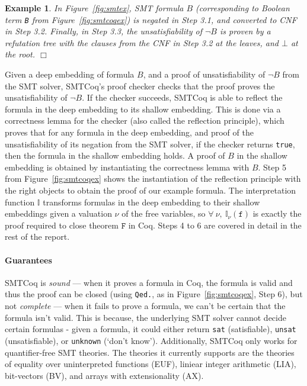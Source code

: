 \documentclass[11pt]{article}
\newtheorem{example}{Example}[section]
\begin{document}
	\begin{example} 
		\em In Figure~\ref{fig:smtex}, 
		SMT formula $B$ (corresponding
		to Boolean term \texttt{B}
		from Figure~\ref{fig:smtcoqex}) is 
		negated in Step 3.1, and converted 
		to CNF in Step 3.2.
		Finally, in Step 3.3, the 
		unsatisfiability of $\neg B$ is 
		proven by a refutation tree with 
		the clauses from the CNF in Step 3.2
		at the leaves, and $\bot$ at the 
		root. \hfill $\Box$
	\end{example}

	Given a deep embedding of 
	formula $B$, and a proof of 
	unsatisfiability of $\neg B$
	from the SMT solver, SMTCoq's proof 
	checker checks that the proof proves
	the unsatisfiability of $\neg B$. If the 
	checker succeeds, SMTCoq is able to 
	reflect the formula in 
	the deep embedding to its shallow 
	embedding. This is done via a 
	correctness lemma for the checker
	(also called the reflection principle),
	which proves that for any 
	formula in the deep embedding, and 
	proof of the unsatisfiability of its 
	negation from the SMT solver, if 
	the checker returns \texttt{true}, 
	then the formula in 
	the shallow embedding holds. A 
	proof of $B$ in the shallow 
	embedding is obtained by instantiating 
	the correctness lemma with $B$.
	Step 5 from Figure~\ref{fig:smtcoqex} 
	shows the instantiation of 
	the reflection principle with 
	the right objects to obtain the 
	proof of our example formula. 
	The interpretation function
	$\mathbb{I}$ transforms 
	formulas in the deep embedding
	to their shallow embeddings
	given a valuation $\nu$ of the 
	free variables, so 
	$\forall\ \nu,\ 
	\mathbb{I}_{\nu}(\texttt{f})$
	is exactly the proof required 
	to close theorem $\texttt{F}$
	in Coq. Steps 4 to 6 are covered
	in detail in the rest of the report.
	
	\paragraph{Guarantees}
	SMTCoq is \textit{sound} ---
	when it proves a formula in Coq, the 
	formula is valid and thus the proof
	can be closed (using \texttt{Qed.},
	as in Figure~\ref{fig:smtcoqex}, 
	Step 6), but 
	not \textit{complete} --- when it 
	fails to prove a formula, we can't 
	be certain that the formula isn't 
	valid. This is because, the underlying 
	SMT solver cannot decide certain 
	formulas - given a formula, it could 
	either return \texttt{sat} 
	(satisfiable), \texttt{unsat} 
	(unsatisfiable), or 
	\texttt{unknown} (`don't know').
	Additionally, SMTCoq only works for 
	quantifier-free SMT theories. The 
	theories it currently supports 
	are the theories of equality over
	uninterpreted functions (EUF), 
	liniear integer arithmetic (LIA),
	bit-vectors (BV), and arrays with
	extensionality (AX).
	
\end{document}
